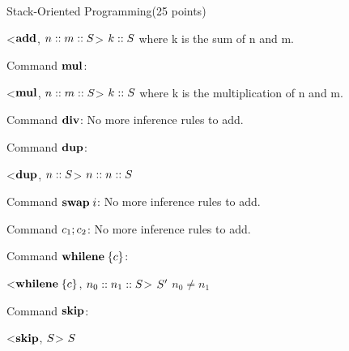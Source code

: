 \documentclass{article}
\begin{document}
\begin{question}{Stack-Oriented Programming}{(25 points)}
\begin{subquestion}
\begin{subsubquestion}
      \infrule[ADD]
      {
      	
      }
      {
      	<$\mathbf{add}$, $n :: m :: S$> \stepsto $k :: S$
      }
      {
      	where k is the sum of n and m.
      }
    \end{subsubquestion}
    \begin{subsubquestion}
      Command $\mathbf{mul}$: 
      
      \infrule[MUL]
      {
      	
      }
      {
      	<$\mathbf{mul}$, $n :: m :: S$> \stepsto $k :: S$
      }
      {
      	where k is the multiplication of n and m.
      }
    \end{subsubquestion}
    \begin{subsubquestion}
      Command $\mathbf{div}$: No more inference rules to add.
    \end{subsubquestion}
    \begin{subsubquestion}
      Command $\mathbf{dup}$: 
      
      \infrule[DUP]
      {
      	
      }
      {
      	<$\mathbf{dup}$, $n :: S$> \stepsto $n :: n :: S$
      }
      {
      }
    \end{subsubquestion}
    \begin{subsubquestion}
      Command $\mathbf{swap}\;{i}$: No more inference rules to add.
    \end{subsubquestion}
    \begin{subsubquestion}
      Command $c_1; c_2$: No more inference rules to add.
    \end{subsubquestion}
    \begin{subsubquestion}
      Command $\mathbf{whilene}\;\{c\}$: 
      
      {
      	<$\mathbf{whilene}\;\{c\}$, $n_0 :: n_1 :: S$> \stepsto $S'$
      }
      {
      	$n_0 \ne n_1$
      }
      
    \end{subsubquestion}
    \begin{subsubquestion}
      Command $\mathbf{skip}$: 
      
      \infrule[SKIP]
      {
      	
      }
      {
      	<$\mathbf{skip}$, $S$> \stepsto $S$
      }
      {
      }
    \end{subsubquestion}


\end{subquestion}
\end{question}
\end{document}
